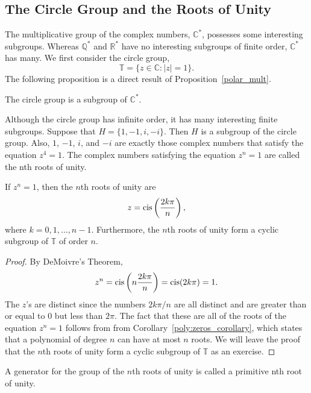  
\subsection*{The Circle Group and the Roots of Unity }
 
 
The multiplicative group of the complex numbers, ${\mathbb C}^*$,
possesses some interesting subgroups.  Whereas ${\mathbb Q}^*$ and ${\mathbb
R}^*$ have no interesting subgroups of finite order, ${\mathbb C}^*$ has 
many. We first consider the {\bfi circle group}, 
\[
{\mathbb T}\label{notecirclegroup} = \{ z \in {\mathbb C} : |z| = 1 \}.
\]
The following proposition is a direct result of Proposition~\ref{polar_mult}.
 
 
\begin{proposition}
The circle group is a subgroup of  ${\mathbb C}^*$.
\end{proposition}
 
 
Although the circle group has infinite order, it has many interesting 
finite subgroups. Suppose that $H = \{ 1, -1, i, -i \}$. Then $H$ is a
subgroup of the circle group. Also, $1$, $-1$, $i$, and $-i$ are
exactly those complex numbers that satisfy the equation $z^4=1$. 
The complex numbers satisfying the equation $z^n=1$ are called
the {\bfi nth roots of unity}. 
 
 
\begin{theorem}
If $z^n = 1$, then the $n$th roots of unity are
\[
z = \operatorname{cis}\left( \frac{2 k \pi}{n } \right),
\]
where $k = 0, 1, \ldots, n-1$. Furthermore, the $n$th roots of unity
form a cyclic subgroup of\/ ${\mathbb T}$ of order $n$. 
\end{theorem}
 
 
\begin{proof}
By DeMoivre's Theorem,
\[
z^n = \operatorname{cis} \left( n \frac{2 k \pi}{n } \right) =
\operatorname{cis}( 2 k \pi ) = 1.
\]
The $z$'s are distinct since the numbers $2 k \pi /n$ are all
distinct and are greater than or equal to 0 but less than $2 \pi$.
The fact that these are all of the roots of the equation $z^n=1$
follows from from Corollary~\ref{poly:zeros_corollary}, which
states that a polynomial of degree $n$ can have at most $n$ roots.  We
will leave the proof that the $n$th roots of unity form a cyclic
subgroup of ${\mathbb T}$ as an exercise.
\end{proof}
 
 
\medskip
 
 
A generator for the group of the $n$th roots of unity is called a
{\bfi primitive nth root of unity}. 
 
